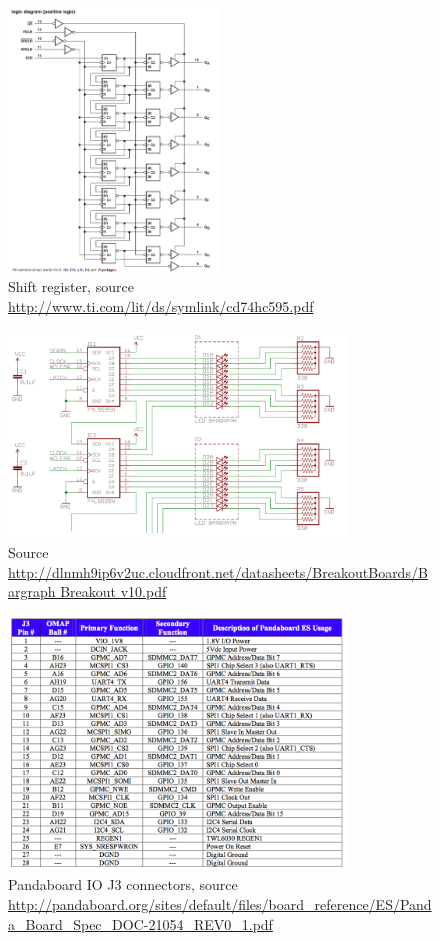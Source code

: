 \begin{figure}[H]
   \centering
   \includegraphics[width=0.5\textwidth]{img/Shift_register.png}%
   \caption{Shift register, source \url{http://www.ti.com/lit/ds/symlink/cd74hc595.pdf}}
   \label{fig:shiftRegister}%
\end{figure}


\begin{figure}[H]
   \centering
   \includegraphics[width=0.8\textwidth]{img/Breakout.png}%
   \caption{Source \url{http://dlnmh9ip6v2uc.cloudfront.net/datasheets/BreakoutBoards/Bargraph Breakout v10.pdf}}
   \label{fig:breakout}%
\end{figure}


\begin{figure}[H]
   \centering
   \includegraphics[width=0.8\textwidth]{img/PandaBoard_IO_J3.png}%
   \caption{Pandaboard IO J3 connectors,  source  \url{http://pandaboard.org/sites/default/files/board_reference/ES/Panda_Board_Spec_DOC-21054_REV0_1.pdf}}
   \label{fig:pandaBoardIOJ3}%
\end{figure}


